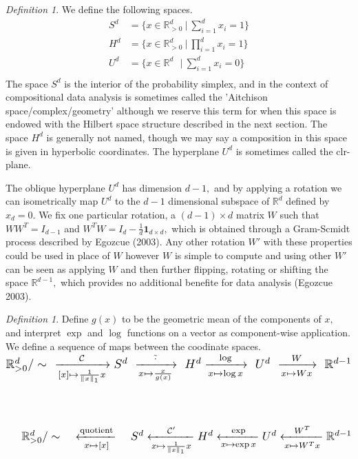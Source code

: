 \documentclass[BSc]{usydthesis}
\numberwithin{equation}{chapter}
\theoremstyle{remark}
\newtheorem{Definition}[equation]{Definition}
\newcommand{\R}{\mathbb{R}}
\begin{document}
\begin{Definition}
 We define the following spaces.
 \begin{align*}
  S^d &= \bigg\{ x \in \mathbb{R}_{>0}^d \ \bigg| \ \sum_{i=1}^d x_i = 1 \bigg\} \\
  H^d &= \bigg\{ x \in \mathbb{R}_{>0}^d \ \bigg| \ \prod_{i=1}^d x_i = 1 \bigg\} \\
  U^d &= \bigg\{ x \in \mathbb{R}^d \ \ \ \bigg| \ \sum_{i=1}^d x_i = 0 \bigg\} \\
 \end{align*}
The space $S^d$ is the interior of the probability simplex, and in the context of compositional data analysis is sometimes called the 'Aitchison space/complex/geometry' although we reserve this term for when this space is endowed with the Hilbert space structure described in the next section. The space $H^d$ is generally not named, though we may say a composition in this space is given in hyperbolic coordinates. The hyperplane $U^d$ is sometimes called the clr-plane. 
\end{Definition}

The oblique hyperplane $U^d$ has dimension $d-1,$ and by applying a rotation we can isometrically map $U^d$ to the $d-1$ dimensional subspace of $\mathbb{R}^{d}$ defined by $x_d=0.$ We fix one particular rotation, a $(d-1) \times d$ matrix $W$ such that $WW^T = I_{d-1}$ and $W^TW = I_d - \frac{1}{d} \mathbf{1}_{d\times d},$ which is obtained through a Gram-Scmidt process described by Egozcue (2003). Any other rotation $W'$ with these properties could be used in place of $W$ however $W$ is simple to compute and using other $W'$ can be seen as applying $W$ and then further flipping, rotating or shifting the space $\mathbb{R}^{d-1},$ which provides no additional benefite for data analysis (Egozcue 2003). 


\begin{Definition}
 Define $g(x)$ to be the geometric mean of the components of $x,$ and interpret $\exp$ and $\log$ functions on a vector as component-wise application. We define a sequence of maps between the coodinate spaces.   \\

$ \scalebox{1.5}{$ \R^d_{> 0}/\sim \ \  \xrightarrow[{[x]\mapsto \frac{1}{\| x\|_1} x }]{{\mathcal{C}}} S^d \  \xrightarrow[{x \mapsto \frac{x}{g(x)}}]{{\tilde{\cdot}}} \ H^d \xrightarrow[{x \mapsto \log x}]{{\log}}\ U^d \ \xrightarrow[{x\mapsto Wx}]{{W}}\ \R^{d-1} $}$
\\
\\
\\
\\
$ \scalebox{1.5}{$ \ \ \ \  \R^d_{> 0}/\sim \ \ \ \ \xleftarrow[{x\mapsto [x] }]{\text{quotient}} \ \ \  S^d \xleftarrow[{x \mapsto \frac{1}{\| x\|_1} x}]{{\mathcal{C}'}} H^d \xleftarrow[{x \mapsto \exp x}]{{\exp}} U^d \xleftarrow[{x\mapsto W^Tx}]{{W^T}}\R^{d-1} $}$
\end{Definition}
\end{document}
